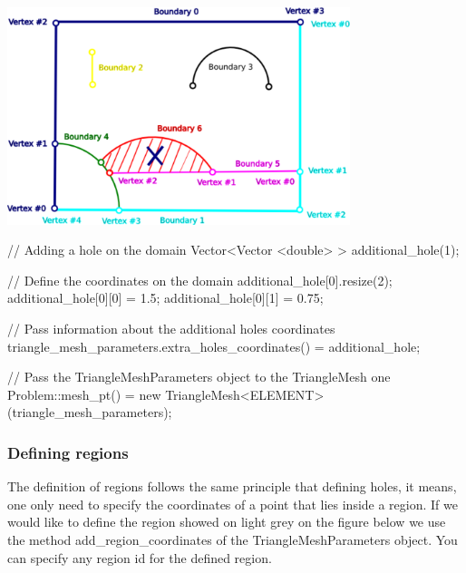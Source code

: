  
\begin{DoxyImage}
\includegraphics[width=0.75\textwidth]{sketch_domain_hole}
\end{DoxyImage}


 
\begin{DoxyCodeInclude}
  \textcolor{comment}{// Adding a hole on the domain}
  Vector<Vector <double> > additional\_hole(1);

  \textcolor{comment}{// Define the coordinates on the domain}
  additional\_hole[0].resize(2);
  additional\_hole[0][0] = 1.5;
  additional\_hole[0][1] = 0.75;

  \textcolor{comment}{// Pass information about the additional holes coordinates}
  triangle\_mesh\_parameters.extra\_holes\_coordinates() = additional\_hole;

\end{DoxyCodeInclude}



\begin{DoxyCodeInclude}
  \textcolor{comment}{// Pass the TriangleMeshParameters object to the TriangleMesh one}
  Problem::mesh\_pt() = \textcolor{keyword}{new} TriangleMesh<ELEMENT>(triangle\_mesh\_parameters);

\end{DoxyCodeInclude}
\hypertarget{index_def_extra_regions}{}\subsubsection{Defining regions}\label{index_def_extra_regions}
The definition of regions follows the same principle that defining holes, it means, one only need to specify the coordinates of a point that lies inside a region. If we would like to define the region showed on light grey on the figure below we use the method {\ttfamily add\+\_\+region\+\_\+coordinates} of the {\ttfamily Triangle\+Mesh\+Parameters} object. You can specify any region id for the defined region.

